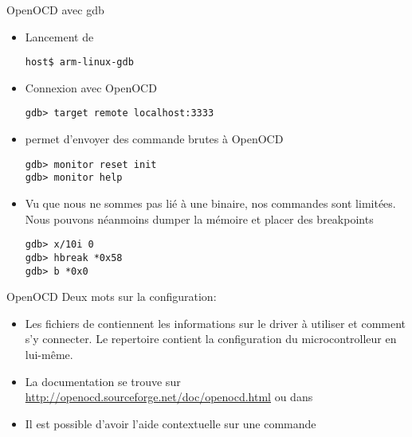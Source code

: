 \begin{frame}[fragile=singleslide]{OpenOCD avec gdb}
  \begin{itemize} 
  \item Lancement de 
    \begin{lstlisting}
host$ arm-linux-gdb
    \end{lstlisting}  
  \item Connexion avec OpenOCD
    \begin{lstlisting} 
gdb> target remote localhost:3333
    \end{lstlisting} 
  \item {} permet d'envoyer des commande brutes à OpenOCD
    \begin{lstlisting} 
gdb> monitor reset init
gdb> monitor help
    \end{lstlisting} 
  \item Vu  que nous ne  sommes pas lié  à une binaire,  nos commandes
    sont limitées. Nous pouvons  néanmoins dumper la mémoire et placer
    des breakpoints
    \begin{lstlisting} 
gdb> x/10i 0
gdb> hbreak *0x58
gdb> b *0x0
    \end{lstlisting} 
  \end{itemize}
\end{frame}

\begin{frame}[fragile=singleslide]{OpenOCD}
  Deux mots sur la configuration:
  \begin{itemize} 
  \item   Les   fichiers   de      contiennent   les
    informations sur le driver à utiliser et comment s'y connecter. Le
    repertoire       contient   la    configuration   du
    microcontrolleur en lui-même.
  \item        La       documentation       se        trouve       sur
    \url{http://openocd.sourceforge.net/doc/openocd.html}    ou   dans
  \item Il  est possible d'avoir l'aide contextuelle  sur une commande
  \end{itemize}
\end{frame}

